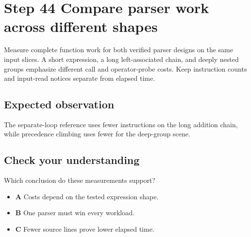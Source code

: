 \section{Step 44 Compare parser work across different shapes}\label{expression-s44}

Measure complete function work for both verified parser designs on the same input slices. A short expression, a long left-associated chain, and deeply nested groups emphasize different call and operator-probe costs. Keep instruction counts and input-read notices separate from elapsed time.

\subsection{Expected observation}
The separate-loop reference uses fewer instructions on the long addition chain, while precedence climbing uses fewer for the deep-group scene.

\subsection{Check your understanding}
Which conclusion do these measurements support?

\begin{itemize}
  \item \textbf{A} Costs depend on the tested expression shape.
  \item \textbf{B} One parser must win every workload.
  \item \textbf{C} Fewer source lines prove lower elapsed time.
\end{itemize}

